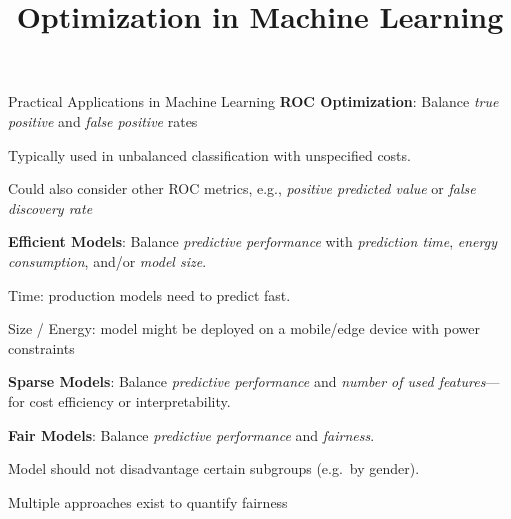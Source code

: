 \documentclass[11pt,compress,t,notes=noshow,xcolor=table]{beamer}
\title{Optimization in Machine Learning}
\begin{document}

\begin{vbframe}{Practical Applications in Machine Learning}
\textbf{ROC Optimization}: Balance \emph{true positive} and \emph{false positive} rates
\begin{itemize}{\small
  \item Typically used in unbalanced classification with unspecified costs.
  \item Could also consider other ROC metrics, e.g., \emph{positive predicted value} or \emph{false discovery rate}}
\end{itemize}

\textbf{Efficient Models}:
Balance \emph{predictive performance} with \emph{prediction time}, \emph{energy consumption}, and/or \emph{model size}.
\begin{itemize}{\small
  \item Time: production models need to predict fast.
  \item Size / Energy: model might be deployed on a mobile/edge device with power constraints}
\end{itemize}

\textbf{Sparse Models}: 
Balance \emph{predictive performance} and \emph{number of used features}—for cost efficiency or interpretability.

\textbf{Fair Models}: 
Balance \emph{predictive performance} and \emph{fairness}.
\begin{itemize} {\small
  \item Model should not disadvantage certain subgroups (e.g.\ by gender).
  \item Multiple approaches exist to quantify fairness}
\end{itemize}
\end{vbframe}
\end{document}
